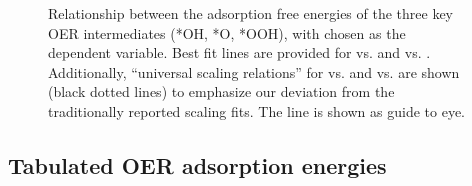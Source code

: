 



\begin{figure}[!htb]
\centering
{}
\caption{\label{fig:scaling_relations}
%
Relationship between the adsorption free energies of the three key OER intermediates (*OH, *O, *OOH), with \DGOH chosen as the dependent variable.
%
Best fit lines are provided for \DGOOH vs. \DGOH and \DGO vs. \DGOH.
%
Additionally, ``universal scaling relations'' for \DGOOH vs. \DGOH and \DGO vs. \DGOH are shown (black dotted lines) to emphasize our deviation from the traditionally reported scaling fits.
%
The \DGOH line is shown as guide to eye.
}
\end{figure}


\subsection{Tabulated OER adsorption energies}
%


